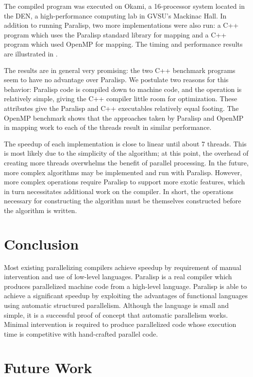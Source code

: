 \documentclass[
abstracton,
fontsize=12pt,
]{scrartcl}
\begin{document}
The compiled program was executed on Okami, a 16-processor system located in the DEN, a high-performance computing lab in GVSU's Mackinac Hall. In addition to running Paralisp, two more implementations were also run: a C++ program which uses the Paralisp standard library for mapping and a C++ program which used OpenMP for mapping. The timing and performance results are illustrated in .

The results are in general very promising: the two C++ benchmark programs seem to have no advantage over Paralisp. We postulate two reasons for this behavior: Paralisp code is compiled down to machine code, and the operation is relatively simple, giving the C++ compiler little room for optimization. These attributes give the Paralisp and C++ executables relatively equal footing. The OpenMP benchmark shows that the approaches taken by Paralisp and OpenMP in mapping work to each of the threads result in similar performance.

The speedup of each implementation is close to linear until about 7 threads. This is most likely due to the simplicity of the algorithm; at this point, the overhead of creating more threads overwhelms the benefit of parallel processing. In the future, more complex algorithms may be implemented and run with Paralisp. However, more complex operations require Paralisp to support more exotic features, which in turn necessitates additional work on the compiler. In short, the operations necessary for constructing the algorithm must be themselves constructed before the algorithm is written.

\section{Conclusion}

Most existing parallelizing compilers achieve speedup by requirement of manual intervention and use of low-level languages. Paralisp is a real compiler which produces parallelized machine code from a high-level language. Paralisp is able to achieve a significant speedup by exploiting the advantages of functional languages using automatic structured parallelism. Although the language is small and simple, it is a successful proof of concept that automatic parallelism works. Minimal intervention is required to produce parallelized code whose execution time is competitive with hand-crafted parallel code.

\section{Future Work}
\end{document}
